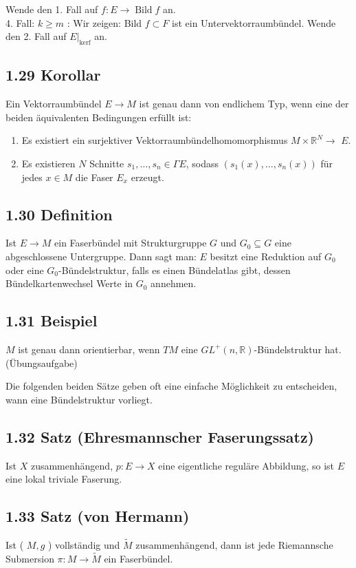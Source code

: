 \documentclass[10pt, letterpaper]{article}
\begin{document}
Wende den 1. Fall auf $f: E \rightarrow \operatorname{Bild} f$ an.\\
4. Fall: $k \geq m$ : Wir zeigen: Bild $f \subset F$ ist ein Untervektorraumbündel. Wende den 2. Fall auf $\left.E\right|_{\operatorname{kerf}}$ an.

\subsection*{1.29 Korollar}
Ein Vektorraumbündel $E \rightarrow M$ ist genau dann von endlichem Typ, wenn eine der beiden äquivalenten Bedingungen erfüllt ist:

\begin{enumerate}
  \item Es existiert ein surjektiver Vektorraumbündelhomomorphismus $M \times \mathbb{R}^{N} \rightarrow$ $E$.
  \item Es existieren $N$ Schnitte $s_{1}, \ldots, s_{n} \in \Gamma E$, sodass $\left(s_{1}(x), \ldots, s_{n}(x)\right)$ für jedes $x \in M$ die Faser $E_{x}$ erzeugt.
\end{enumerate}

\subsection*{1.30 Definition}
Ist $E \rightarrow M$ ein Faserbündel mit Strukturgruppe $G$ und $G_{0} \subseteq G$ eine abgeschlossene Untergruppe. Dann sagt man: $E$ besitzt eine Reduktion auf $G_{0}$ oder eine $G_{0}$-Bündelstruktur, falls es einen Bündelatlas gibt, dessen Bündelkartenwechsel Werte in $G_{0}$ annehmen.

\subsection*{1.31 Beispiel}
$M$ ist genau dann orientierbar, wenn $T M$ eine $G L^{+}(n, \mathbb{R})$-Bündelstruktur hat. (Übungsaufgabe)

Die folgenden beiden Sätze geben oft eine einfache Möglichkeit zu entscheiden, wann eine Bündelstruktur vorliegt.

\subsection*{1.32 Satz (Ehresmannscher Faserungssatz)}
Ist $X$ zusammenhängend, $p: E \rightarrow X$ eine eigentliche reguläre Abbildung, so ist $E$ eine lokal triviale Faserung.

\subsection*{1.33 Satz (von Hermann)}
Ist ( $M, g$ ) vollständig und $\tilde{M}$ zusammenhängend, dann ist jede Riemannsche Submersion $\pi: M \rightarrow \tilde{M}$ ein Faserbündel.
\end{document}
